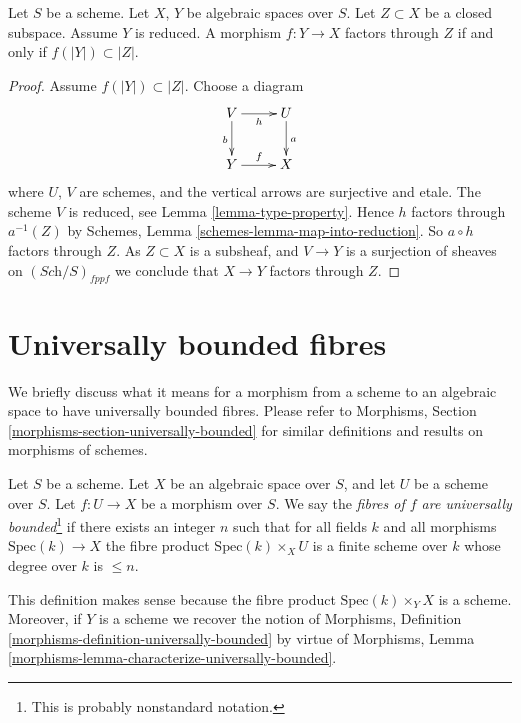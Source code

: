 \begin{lemma}
\label{lemma-map-into-reduction}
Let $S$ be a scheme.
Let $X$, $Y$ be algebraic spaces over $S$.
Let $Z \subset X$ be a closed subspace.
Assume $Y$ is reduced.
A morphism $f : Y \to X$ factors through $Z$ if and only if
$f(|Y|) \subset |Z|$.
\end{lemma}

\begin{proof}
Assume $f(|Y|) \subset |Z|$. Choose a diagram
$$
\xymatrix{
V \ar[d]_b \ar[r]_h & U \ar[d]^a \\
Y \ar[r]^f & X
}
$$
where $U$, $V$ are schemes, and the vertical arrows are surjective and
etale. The scheme $V$ is reduced, see
Lemma \ref{lemma-type-property}.
Hence $h$ factors through $a^{-1}(Z)$ by
Schemes, Lemma \ref{schemes-lemma-map-into-reduction}.
So $a \circ h$ factors through $Z$.
As $Z \subset X$ is a subsheaf, and $V \to Y$ is a surjection of sheaves
on $(\textit{Sch}/S)_{fppf}$ we conclude that $X \to Y$ factors
through $Z$.
\end{proof}





\section{Universally bounded fibres}
\label{section-universally-bounded}

\noindent
We briefly discuss what it means for a morphism from a scheme to an
algebraic space to have universally bounded fibres. Please refer to
Morphisms, Section \ref{morphisms-section-universally-bounded}
for similar definitions and results on morphisms of schemes.

\begin{definition}
\label{definition-universally-bounded}
Let $S$ be a scheme. Let $X$ be an algebraic space over $S$, and
let $U$ be a scheme over $S$. Let $f : U \to X$ be a morphism over $S$.
We say the {\it fibres of $f$ are universally bounded}\footnote{This is
probably nonstandard notation.}
if there exists an integer $n$ such that for all fields
$k$ and all morphisms $\text{Spec}(k) \to X$ the fibre
product $\text{Spec}(k) \times_X U$ is a finite scheme over $k$
whose degree over $k$ is $\leq n$.
\end{definition}

\noindent
This definition makes sense because the fibre product
$\text{Spec}(k) \times_Y X$ is a scheme. Moreover, if $Y$ is a scheme
we recover the notion of
Morphisms, Definition \ref{morphisms-definition-universally-bounded}
by virtue of
Morphisms, Lemma \ref{morphisms-lemma-characterize-universally-bounded}.

